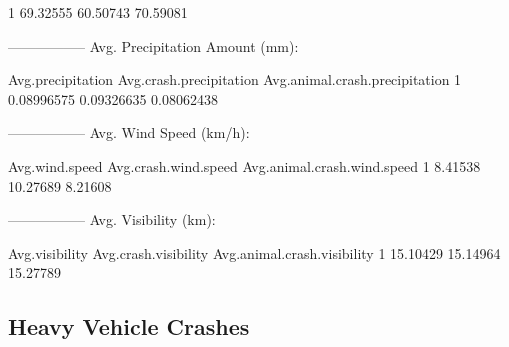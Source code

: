 \documentclass[11pt, a4paper]{article}
\begin{document}
\begin{Schunk}
\begin{Soutput}
1     69.32555           60.50743                  70.59081
\end{Soutput}
\begin{Soutput}
-----------------
Avg. Precipitation Amount (mm):
\end{Soutput}
\begin{Soutput}
  Avg.precipitation Avg.crash.precipitation Avg.animal.crash.precipitation
1        0.08996575              0.09326635                     0.08062438
\end{Soutput}
\begin{Soutput}
-----------------
Avg. Wind Speed (km/h):
\end{Soutput}
\begin{Soutput}
  Avg.wind.speed Avg.crash.wind.speed Avg.animal.crash.wind.speed
1        8.41538             10.27689                     8.21608
\end{Soutput}
\begin{Soutput}
-----------------
Avg. Visibility (km):
\end{Soutput}
\begin{Soutput}
  Avg.visibility Avg.crash.visibility Avg.animal.crash.visibility
1       15.10429             15.14964                    15.27789
\end{Soutput}
\end{Schunk}



\pagebreak
\subsection{Heavy Vehicle Crashes}
\end{document}
